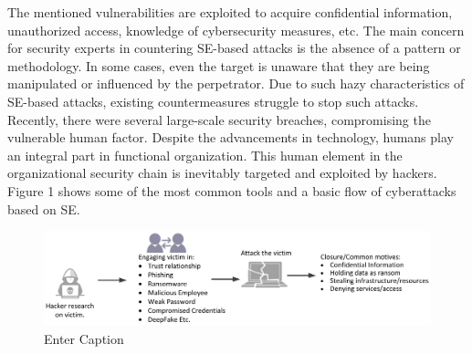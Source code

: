 The mentioned vulnerabilities are exploited to acquire confidential information, unauthorized access, knowledge of cybersecurity measures, etc. The main concern for security experts in countering SE-based attacks is the absence of a pattern or methodology. In some cases, even the target is unaware that they are being manipulated or influenced by the perpetrator. Due to such hazy characteristics of SE-based attacks, existing countermeasures struggle to stop such attacks. Recently, there were several large-scale security breaches, compromising the vulnerable human factor. Despite the advancements in technology, humans play an integral part in functional organization. This human element in the organizational security chain is inevitably targeted and exploited by hackers. Figure 1 shows some of the most common tools and a basic flow of cyberattacks based on SE.
\begin{figure}
    \justifying
    \includegraphics[width=0.75\linewidth]{socengflow.png}
    \caption{Enter Caption}
    \label{fig:placeholder}
\end{figure}
